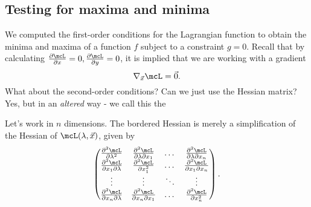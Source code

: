 \documentclass[a4paper, 12pt,oneside,openany]{book}
\begin{document}
\subsection{Testing for maxima and minima}

We computed the first-order conditions for the Lagrangian function to obtain the minima and maxima of a function $f$ subject to a constraint $g=0$. Recall that by calculating $\frac{\partial \mcL}{\partial x}=0, \frac{\partial \mcL}{\partial y}=0$, it is implied that we are working with a gradient $$\nabla_{\vec{x}} \mcL = \vec{0}.$$ What about the second-order conditions? Can we just use the Hessian matrix? Yes, but in an \emph{altered} way - we call this the 


Let's work in $n$ dimensions. The bordered Hessian is merely a simplification of the Hessian of $\mcL(\lambda, \vec{x})$, given by $$\begin{pmatrix} \frac{\partial^2 \mcL}{\partial \lambda^2} & \frac{\partial^2 \mcL}{\partial \lambda \partial x_1} & \dots & \frac{\partial^2 \mcL}{\partial \lambda \partial x_n} \\ \frac{\partial^2 \mcL}{ \partial x_1 \partial \lambda} &  \frac{\partial^2 \mcL}{ \partial x_1^2} & \dots & \frac{\partial^2 \mcL}{ \partial x_1 \partial x_n} \\ \vdots & \vdots & \ddots & \vdots \\ \frac{\partial^2 \mcL}{ \partial x_n \partial \lambda} & \frac{\partial^2 \mcL}{ \partial x_n \partial x_1} & \dots & \frac{\partial^2 \mcL}{ \partial x_n^2}\end{pmatrix}.$$
\end{document}
